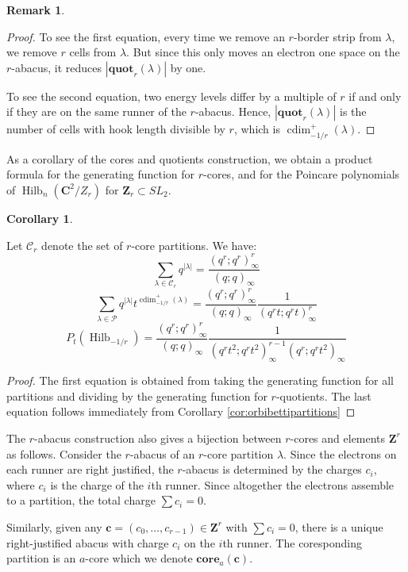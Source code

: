 \documentclass{amsart}[12pt]
\theoremstyle{definition}
\newtheorem{corollary}[dummy]{Corollary}
\newtheorem{remark}[dummy]{Remark}
\newcommand{\Z}{\mathbf{Z}}
\newcommand{\C}{\mathbf{C}}
\newcommand{\core}{\mathbf{core}}
\newcommand{\quot}{\mathbf{quot}}
\newcommand{\cores}{\mathcal{C}}
\DeclareMathOperator{\Hilb}{Hilb}
\DeclareMathOperator{\cdim}{cdim}
\begin{document}
\begin{remark}
\begin{proof}
To see the first equation, every time we remove an $r$-border strip from $\lambda$, we remove $r$ cells from $\lambda$.  But since this only moves an electron one space on the $r$-abacus, it reduces $|\quot_r(\lambda)|$ by one.

To see the second equation, two energy levels differ by a multiple of $r$ if and only if they are on the same runner of the $r$-abacus.  Hence, $|\quot_r(\lambda)|$ is the number of cells with hook length divisible by $r$, which is $\cdim^+_{-1/r}(\lambda)$.

\end{proof}


As a corollary of the cores and quotients construction, we obtain a product formula for the generating function for $r$-cores, and for the Poincare polynomials of $\Hilb_n(\C^2/Z_r)$ for $\Z_r\subset SL_2$.

\begin{corollary} \label{cor:product-formulas-traditional-cores}

Let $\mathcal{C}_r$ denote the set of $r$-core partitions.  We have:
\begin{equation} \label{eq:cores-product}
  \sum_{\lambda\in\cores_r} q^{|\lambda|}=\frac{(q^r;q^r)_\infty^r}{(q;q)_\infty}
  \end{equation}
$$\sum_{\lambda\in\mathcal{P}} q^{|\lambda|} t^{\cdim^+_{-1/r}(\lambda)}=\frac{(q^r;q^r)_\infty^r}{(q;q)_\infty}\frac{1}{(q^rt;q^rt)_\infty^r}$$
$$P_t(\Hilb_{-1/r})=\frac{(q^r;q^r)_\infty^r}{(q;q)_\infty}\frac{1}{(q^rt^2;q^rt^2)_\infty^{r-1}(q^r;q^rt^2)_\infty}$$
\end{corollary}
\begin{proof}
The first equation is obtained from taking the generating function for all partitions and dividing by the generating function for $r$-quotients.  The last equation follows immediately from Corollary \ref{cor:orbibettipartitions}
\end{proof}

The $r$-abacus construction also gives a bijection between $r$-cores and elements $\Z^r$ as follows.  Consider the $r$-abacus of an $r$-core partition $\lambda$.  Since the electrons on each runner are right justified, the $r$-abacus is determined by the charges $c_i$, where $c_i$ is the charge of the $i$th runner.  Since altogether the electrons assemble to a partition, the total charge $\sum c_i=0$.  

Similarly, given any $\mathbf{c}=(c_0,\dots,c_{r-1})\in\Z^r$ with $\sum c_i=0$, there is a unique right-justified abacus with charge $c_i$ on the $i$th runner.  The coresponding partition is an $a$-core which we denote $\core_a(\mathbf{c})$.


\end{remark}
\end{document}
